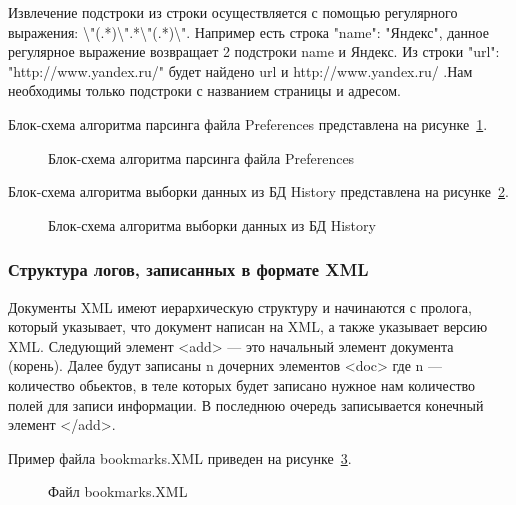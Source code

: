 Извлечение подстроки из строки осуществляется с помощью регулярного выражения: \textbackslash "(.*)\textbackslash".*\textbackslash"(.*)\textbackslash".
Например есть строка "name": "Яндекс", данное регулярное выражение возвращает 2 подстроки name и Яндекс. Из строки "url": "http://www.yandex.ru/" будет найдено url и http://www.yandex.ru/ .Нам необходимы только подстроки с названием страницы и адресом. 

Блок-схема алгоритма парсинга файла Preferences представлена на рисунке~\ref{prefences_parsing:prefences_parsing}.

\begin{figure}[h!]
\caption{Блок-схема алгоритма парсинга файла Preferences}
\label{prefences_parsing:prefences_parsing}
\end{figure}

Блок-схема алгоритма выборки данных из БД History представлена на рисунке~\ref{history_select:history_select}.

\begin{figure}[h!] 
\caption{Блок-схема алгоритма выборки данных из БД History}
\label{history_select:history_select}
\end{figure}


\subsubsection{Структура логов, записанных в формате XML} 
Документы XML имеют иерархическую структуру и начинаются с пролога, который указывает, что документ написан на XML, а также указывает версию XML. Следующий элемент <add> --- это начальный элемент документа (корень). Далее будут записаны n дочерних элементов <doc> где n --- количество обьектов, в теле которых будет записано нужное нам количество полей для записи информации. В последнюю очередь записывается конечный элемент </add>.

Пример файла bookmarks.XML приведен на рисунке~\ref{bookmarks_xml:bookmarks_xml}.

\begin{figure}[ht]                                            %
\caption{Файл bookmarks.XML}
\label{bookmarks_xml:bookmarks_xml}
\end{figure}

